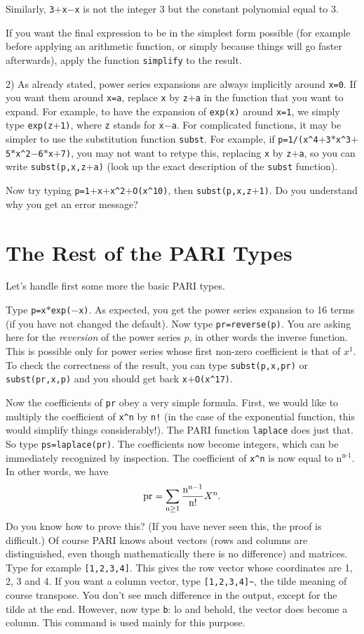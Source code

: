 Similarly, {\tt 3$+$x$-$x} is not the integer 3 but the constant polynomial equal
to 3.

If you want the final expression to be in the simplest form possible (for
example before applying an arithmetic function, or simply because things
will go faster afterwards), apply the function {\tt simplify} to the 
result.

2) As already stated, power series expansions are always implicitly around {\tt x=0}. If you
want them around {\tt x=a}, replace {\tt x} by {\tt z$+$a} in the function that you want to
expand. For example, to have the expansion of {\tt exp(x)} around {\tt x=1}, we simply type
{\tt exp(z$+$1)}, where {\tt z} stands for {\tt x$-$a}. For complicated functions, it may be
simpler to use the substitution function {\tt subst}. For example, if 
{\tt p=1/(x\^{}4$+$3$*$x\^{}3$+$5$*$x\^{}2$-$6$*$x$+$7)}, you may not want to retype this, replacing {\tt x} by {\tt z$+$a},
so you can write {\tt subst(p,x,z$+$a)} (look up the exact description of the {\tt subst} function).

Now try typing {\tt p=1$+$x$+$x\^{}2$+$O(x\^{}10)}, then {\tt subst(p,x,z$+$1)}. Do you 
understand why you get an error message?
\medskip
\section{The Rest of the PARI Types}
\medskip
Let's handle first some more the basic PARI types.

Type {\tt p=x$*$exp($-$x)}. As expected, you get the power series expansion
to 16 terms (if you have not changed the default). Now type
{\tt pr=reverse(p)}. You are asking here for the {\sl reversion\/} of the
power series $p$, in other words the inverse function. This is possible only
for power series whose first non-zero coefficient is that of $x^1$.
To check the correctness of the result, you can type {\tt subst(p,x,pr)}
or {\tt subst(pr,x,p)} and you should get back {\tt x$+$O(x\^{}17)}.

Now the coefficients of {\tt pr} obey a very simple formula. First, we would
like to multiply the coefficient of {\tt x\^{}n} by {\tt n!} (in the case of the
exponential function, this would simplify things considerably!). The PARI
function {\tt laplace} does just that. So type {\tt ps=laplace(pr)}. The
coefficients now become integers, which can be immediately recognized by
inspection. The coefficient of {\tt x\^{}n} is now equal to $\text{n}^{\text{n-1}}$. In other words, we have 
\def\n{{\rm n}}
$$\text{pr}=\sum_{\n\ge1}\dfrac{\n^{\n-1}}{\n!}X^{\n}.$$Do you know how to
prove this? (If you have never seen this, the proof is difficult.)
\smallskip
Of course PARI knows about vectors (rows and columns are distinguished, even
though mathematically there is no difference) and matrices. Type for example
{\tt [1,2,3,4]}. This gives the row vector whose coordinates are 1, 2, 3 and 4.
If you want a column vector, type {\tt [1,2,3,4]\~{}}, the tilde meaning of
course transpose. You don't see much difference in the output, except for the
tilde at the end. However, now type {\tt \bs b}: lo and behold, the vector
does become a column. This command is used mainly for this purpose.

